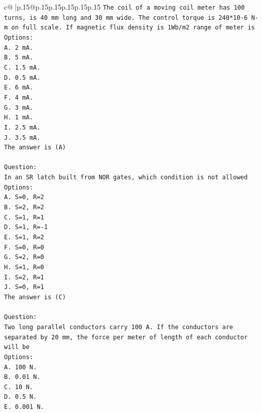 \documentclass{article}
\begin{document}
{\begin{supertabular}{c@{$\;$}|p{.15\linewidth}@{}p{.15\linewidth}p{.15\linewidth}p{.15\linewidth}p{.15\linewidth}p{.15\linewidth}}
{{{\texttt{The coil of a moving coil meter has 100 turns, is 40 mm long and 30 mm wide. The control torque is 240*10{-}6 N{-}m on full scale. If magnetic flux density is 1Wb/m2 range of meter is} \\
\texttt{Options:} \\
\texttt{A. 2 mA.} \\
\texttt{B. 5 mA.} \\
\texttt{C. 1.5 mA.} \\
\texttt{D. 0.5 mA.} \\
\texttt{E. 6 mA.} \\
\texttt{F. 4 mA.} \\
\texttt{G. 3 mA.} \\
\texttt{H. 1 mA.} \\
\texttt{I. 2.5 mA.} \\
\texttt{J. 3.5 mA.} \\
\texttt{The answer is (A)} \\
\\ 
\texttt{Question:} \\
\texttt{In an SR latch built from NOR gates, which condition is not allowed} \\
\texttt{Options:} \\
\texttt{A. S=0, R=2} \\
\texttt{B. S=2, R=2} \\
\texttt{C. S=1, R=1} \\
\texttt{D. S=1, R={-}1} \\
\texttt{E. S=1, R=2} \\
\texttt{F. S=0, R=0} \\
\texttt{G. S=2, R=0} \\
\texttt{H. S=1, R=0} \\
\texttt{I. S=2, R=1} \\
\texttt{J. S=0, R=1} \\
\texttt{The answer is (C)} \\
\\ 
\texttt{Question:} \\
\texttt{Two long parallel conductors carry 100 A. If the conductors are separated by 20 mm, the force per meter of length of each conductor will be} \\
\texttt{Options:} \\
\texttt{A. 100 N.} \\
\texttt{B. 0.01 N.} \\
\texttt{C. 10 N.} \\
\texttt{D. 0.5 N.} \\
\texttt{E. 0.001 N.} \\
}}}
\end{supertabular}}
\end{document}
